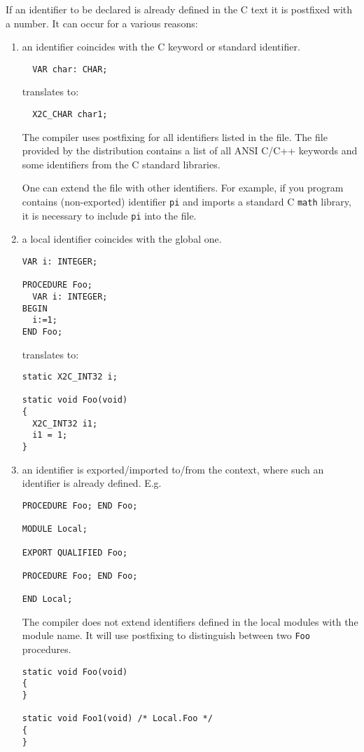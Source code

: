 If an identifier to be declared is already defined in the C text
it is postfixed with a number. It can occur for a various
reasons:
\begin{enumerate}

\item an identifier coincides with the C keyword or
standard identifier.
\begin{verbatim}
  VAR char: CHAR;
\end{verbatim}
translates to:
\begin{verbatim}
  X2C_CHAR char1;
\end{verbatim}
The compiler uses postfixing for all identifiers listed in the
{\tt \kwd} file. The file provided by the distribution contains a
list of all ANSI C/C++ keywords and some identifiers from the C
standard libraries.

One can extend the file with other identifiers. For example, if
you program contains (non-exported) identifier {\tt pi} and
imports a standard C {\tt math} library, it is necessary to include
{\tt pi} into the {\tt \kwd} file.

\item a local identifier coincides with the global one.
\begin{verbatim}
VAR i: INTEGER;

PROCEDURE Foo;
  VAR i: INTEGER;
BEGIN
  i:=1;
END Foo;
\end{verbatim}
translates to:
\begin{verbatim}
static X2C_INT32 i;

static void Foo(void)
{
  X2C_INT32 i1;
  i1 = 1;
}
\end{verbatim}

\item an identifier is exported/imported to/from the context, where
such an identifier is already defined. E.g.
\begin{verbatim}
PROCEDURE Foo; END Foo;

MODULE Local;

EXPORT QUALIFIED Foo;

PROCEDURE Foo; END Foo;

END Local;
\end{verbatim}
The compiler does not extend identifiers defined in the local modules
with the module name. It will use postfixing
to distinguish between two {\tt Foo} procedures.
\begin{verbatim}
static void Foo(void)
{
}

static void Foo1(void) /* Local.Foo */
{
}
\end{verbatim}

\end{enumerate}

